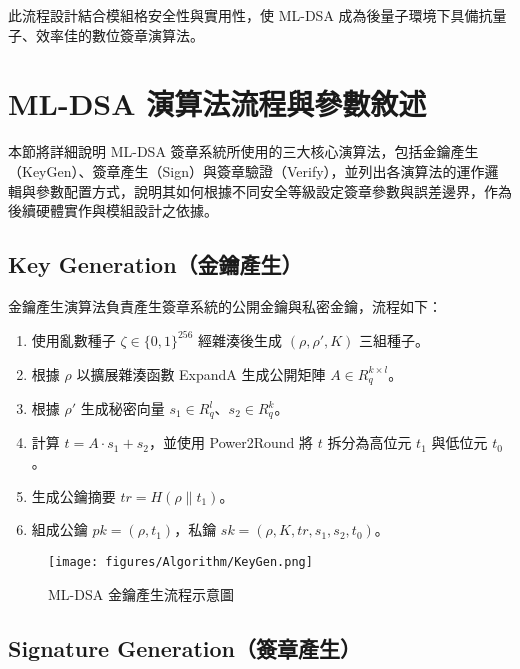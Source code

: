 \documentclass[12pt, a4paper, fleqn]{./styles/ntust_report}
\begin{document}
此流程設計結合模組格安全性與實用性，使 ML-DSA 成為後量子環境下具備抗量子、效率佳的數位簽章演算法。



\section{ML-DSA 演算法流程與參數敘述}

本節將詳細說明 ML-DSA 簽章系統所使用的三大核心演算法，包括金鑰產生（KeyGen）、簽章產生（Sign）與簽章驗證（Verify），並列出各演算法的運作邏輯與參數配置方式，說明其如何根據不同安全等級設定簽章參數與誤差邊界，作為後續硬體實作與模組設計之依據。

\subsection{Key Generation（金鑰產生）}

金鑰產生演算法負責產生簽章系統的公開金鑰與私密金鑰，流程如下：

\begin{enumerate}
  \item 使用亂數種子 $\zeta \in \{0,1\}^{256}$ 經雜湊後生成 $(\rho, \rho', K)$ 三組種子。
  \item 根據 $\rho$ 以擴展雜湊函數 ExpandA 生成公開矩陣 $A \in R_q^{k \times l}$。
  \item 根據 $\rho'$ 生成秘密向量 $s_1 \in R_q^l$、$s_2 \in R_q^k$。
  \item 計算 $t = A \cdot s_1 + s_2$，並使用 Power2Round 將 $t$ 拆分為高位元 $t_1$ 與低位元 $t_0$。
  \item 生成公鑰摘要 $tr = H(\rho \| t_1)$。
  \item 組成公鑰 $pk = (\rho, t_1)$，私鑰 $sk = (\rho, K, tr, s_1, s_2, t_0)$。
\end{enumerate}

\begin{figure}[H]
    \centering
    \texttt{[image: figures/Algorithm/KeyGen.png]}
    \caption{ML-DSA 金鑰產生流程示意圖}
\end{figure}

\subsection{Signature Generation（簽章產生）}
\end{document}
